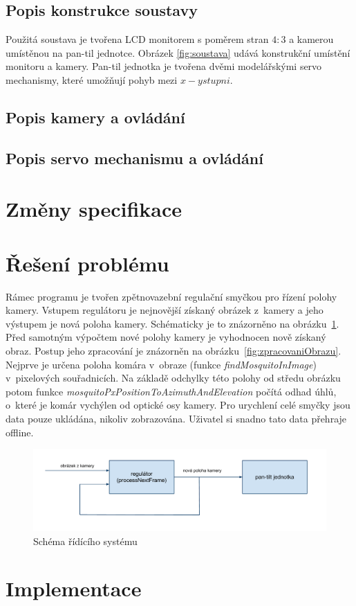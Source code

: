 \documentclass[a4paper,10pt]{article}
\begin{document}
		\subsection{Popis konstrukce soustavy}
		Použitá soustava je tvořena LCD monitorem s poměrem stran $4:3$ a kamerou \cite{kamera} umístěnou na pan-til jednotce.
		Obrázek \ref{fig:soustava} udává konstrukční umístění monitoru a kamery. 
		Pan-til jednotka je tvořena dvěmi modelářskými servo mechanismy, které umožňují pohyb mezi $x-y stupni$.

	       \subsection{Popis kamery a ovládání}

	       \subsection{Popis servo mechanismu a ovládání}

\section{Změny specifikace}

\section{Řešení problému}

		Rámec programu je tvořen zpětnovazební regulační smyčkou pro řízení polohy
		kamery. Vstupem regulátoru je nejnovější získaný obrázek z~kamery a jeho
		výstupem je nová poloha kamery. Schématicky je to znázorněno na
		obrázku~\ref{fig:ridiciSystem}.  Před samotným výpočtem nové polohy kamery
		je vyhodnocen nově zís\-ka\-ný obraz. Postup jeho zpracování je znázorněn na
		obrázku~\ref{fig:zpracovaniObrazu}.  Nejprve je určena poloha komára v~obraze
		(funkce \textit{findMosquitoInImage}) v~pixelových sou\-řad\-ni\-cích. Na základě odchylky
		této polohy od středu obrázku potom funkce
		\textit{mos\-quito\-Px\-PositionToAzimuthAndElevation} počítá odhad úhlů, o~které je
		komár vy\-chý\-len od optické osy kamery. Pro urychlení celé smyčky jsou data pouze
		ukládána, nikoliv zobrazována. Uživatel si snadno tato data přehraje offline.

		\begin{figure}[!h]
			\centering
			 \includegraphics[width=1\columnwidth]{pics/schema_ridiciho_systemu}
			 \caption{Schéma řídícího systému}\label{fig:ridiciSystem}
		\end{figure}

\section{Implementace}



\end{document}
